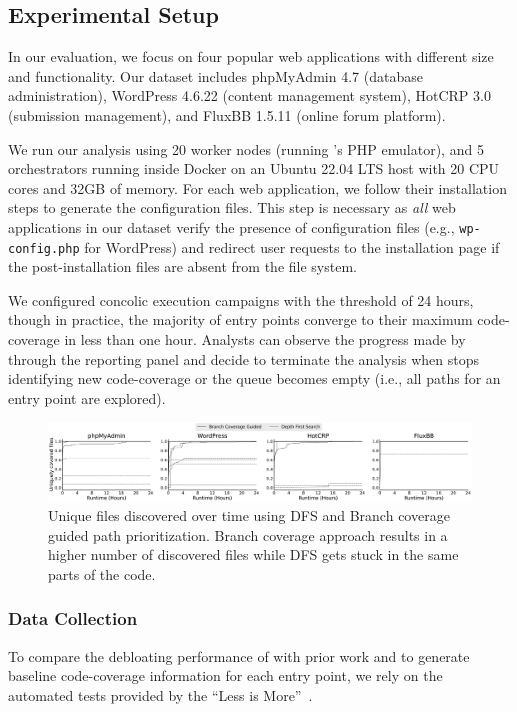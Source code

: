 \subsection{Experimental Setup}

In our evaluation, we focus on four popular web applications with different size and functionality. 
Our dataset includes phpMyAdmin 4.7 (database administration), WordPress 4.6.22 (content management system), HotCRP 3.0 (submission management), and FluxBB 1.5.11 (online forum platform). 

We run our analysis using 20 worker nodes (running \animatedead{}'s PHP emulator), and 5 orchestrators running inside Docker on an Ubuntu 22.04 LTS host with 20 CPU cores and 32GB of memory. 
For each web application, we follow their installation steps to generate the configuration files. 
This step is necessary as \emph{all} web applications in our dataset verify the presence of configuration files (e.g., \texttt{wp-config.php} for WordPress) and redirect user requests to the installation page if the post-installation files are absent from the file system. 

We configured concolic execution campaigns with the threshold of 24 hours, though in practice, the majority of entry points converge to their maximum code-coverage in less than one hour. 
Analysts can observe the progress made by \animatedead{} through the reporting panel and decide to terminate the analysis when \animatedead{} stops identifying new code-coverage or the queue becomes empty (i.e., all paths for an entry point are explored). 

\begin{figure}[t]
    \centering
    \includegraphics[width=\textwidth]{figures/ad/execution_convergence.pdf}
    \caption{Unique files discovered over time using DFS and Branch coverage guided path prioritization. Branch coverage approach results in a higher number of discovered files while DFS gets stuck in the same parts of the code.}
    \label{fig:execution_convergence}
\end{figure}

\subsubsection*{Data Collection} 
To compare the debloating performance of \animatedead{} with prior work and to generate baseline code-coverage information for each entry point, we rely on the automated tests provided by the ``Less is More''~\cite{azad2019less}. 

